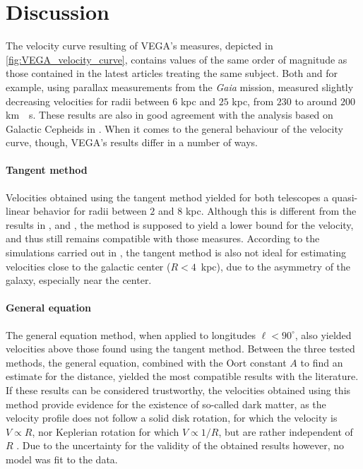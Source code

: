\section{Discussion}
The velocity curve resulting of VEGA's measures, depicted in \autoref{fig:VEGA_velocity_curve}, contains values of the same order of magnitude as those contained in the latest articles treating the same subject.
Both \cite{ou_dark_2024} and \cite{eilers_circular_2019} for example, using parallax measurements from the \emph{Gaia} mission, measured slightly decreasing velocities for radii between $6$ kpc and $25$ kpc, from $230$ to around $200$ \unit{km \per s}.
These results are also in good agreement with the analysis based on Galactic Cepheids in \cite{mroz_rotation_2019}.
When it comes to the general behaviour of the velocity curve, though, VEGA's results differ in a number of ways.

\paragraph{Tangent method} 
Velocities obtained using the tangent method yielded for both telescopes a quasi-linear behavior for radii between $2$ and $8$ kpc. Although this is different from the results in \cite{ou_dark_2024}, \cite{eilers_circular_2019} and \cite{mroz_rotation_2019}, the method is supposed to yield a lower bound for the velocity, and thus still remains compatible with those measures.
According to the simulations carried out in \cite{chemin_incorrect_2015}, the tangent method is also not ideal for estimating velocities close to the galactic center \mbox{($R < 4$ kpc)}, due to the asymmetry of the galaxy, especially near the center.

\paragraph{General equation}
The general equation method, when applied to longitudes $\ell < 90^\circ$, also yielded velocities above those found using the tangent method. 
Between the three tested methods, the general equation, combined with the Oort constant $A$ to find an estimate for the distance, yielded the most compatible results with the literature. If these results can be considered trustworthy, the velocities obtained using this method provide evidence for the existence of so-called dark matter, as the velocity profile does not follow a solid disk rotation, for which the velocity is $V \propto R$, nor Keplerian rotation for which $V \propto 1/R$, but are rather independent of $R$ \cite{horellou_SALSA_2015}. Due to the uncertainty for the validity of the obtained results however, no model was fit to the data.

